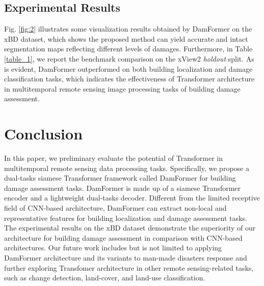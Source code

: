 \documentclass{article}
\begin{document}
\subsection{Experimental Results}\label{sec:experi_result}
\par Fig. \ref{fig:2} illustrates some visualization results obtained by DamFormer on the xBD dataset, which shows the proposed method can yield accurate and intact segmentation maps reflecting different levels of damages. Furthermore, in Table \ref{table_1}, we report the benchmark comparison on the xView2 \emph{holdout} split. As is evident, DamFormer outperformed on both building localization and damage classification tasks, which indicates the effectiveness of Transformer architecture in multitemporal remote sensing image processing tasks of building damage assessment. 

\section{Conclusion}
\label{sec:conclusion}

\par In this paper, we preliminary evaluate the potential of Transformer in multitemporal remote sensing data processing tasks. Specifically, we propose a dual-tasks siamese Transformer framework called DamFormer for building damage assessment tasks. DamFormer is made up of a siamese Transformer encoder and a lightweight dual-tasks decoder. Different from the limited receptive field of CNN-based architecture, DamFormer can extract non-local and representative features for building localization and damage assessment tasks. The experimental results on the xBD dataset demonstrate the superiority of our architecture for building damage assessment in comparison with CNN-based architectures. Our future work includes but is not limited to applying DamFormer architecture and its variants to man-made disasters response and further exploring Transfomer architecture in other remote sensing-related tasks, such as change detection, land-cover, and land-use classification.




\small


\end{document}
